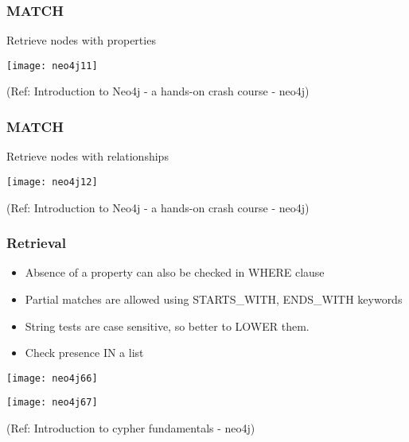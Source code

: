\begin{frame}[fragile]\frametitle{MATCH}

Retrieve nodes with properties

\begin{center}
\texttt{[image: neo4j11]}
\end{center}	  


{\tiny (Ref: Introduction to Neo4j - a hands-on crash course  - neo4j)}

\end{frame}

\begin{frame}[fragile]\frametitle{MATCH}

Retrieve nodes with relationships

\begin{center}
\texttt{[image: neo4j12]}
\end{center}	  


{\tiny (Ref: Introduction to Neo4j - a hands-on crash course  - neo4j)}

\end{frame}

\begin{frame}[fragile]\frametitle{Retrieval}


\begin{itemize}
\item Absence of a property can also be checked in WHERE clause
\item Partial matches are allowed using STARTS\_WITH, ENDS\_WITH keywords
\item String tests are case sensitive, so better to LOWER them.
\item Check presence IN a list
\end{itemize}


\begin{center}
\texttt{[image: neo4j66]}

\texttt{[image: neo4j67]}

\end{center}	  


{\tiny (Ref: Introduction to cypher fundamentals  - neo4j)}

\end{frame}

